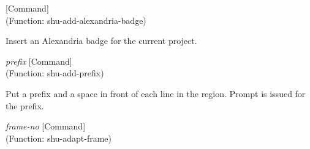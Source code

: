 \vspace{1em}
\noindent
{}
\usebox{\funcname}
 \hfill [Command]\\%
 (Function: shu-add-alexandria-badge)

\begin{doc-string}
Insert an Alexandria badge for the current project.
\end{doc-string}

\vspace{1em}
\noindent
{}
\usebox{\funcname}\emph{prefix}
 \hfill [Command]\\%
 (Function: shu-add-prefix)

\begin{doc-string}
Put a prefix and a space in front of each line in the region.  Prompt is issued
for the prefix.
\end{doc-string}

\vspace{1em}
\noindent
{}
\usebox{\funcname}\emph{frame-no}
 \hfill [Command]\\%
 (Function: shu-adapt-frame)

